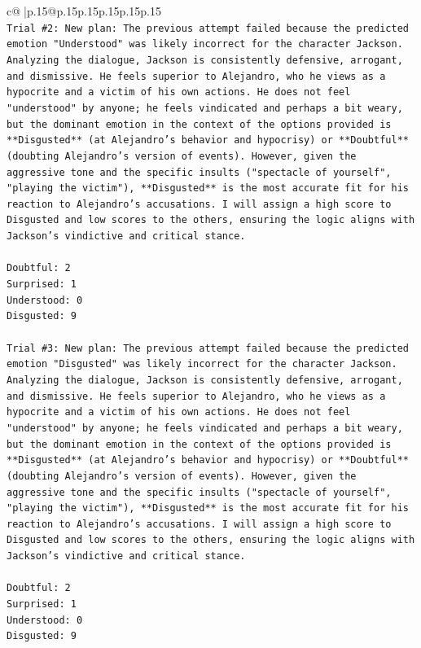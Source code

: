 \documentclass{article}
\begin{document}
{\begin{supertabular}{c@{$\;$}|p{.15\linewidth}@{}p{.15\linewidth}p{.15\linewidth}p{.15\linewidth}p{.15\linewidth}p{.15\linewidth}}
{{{\\ 
\texttt{Trial \#2: New plan: The previous attempt failed because the predicted emotion "Understood" was likely incorrect for the character Jackson. Analyzing the dialogue, Jackson is consistently defensive, arrogant, and dismissive. He feels superior to Alejandro, who he views as a hypocrite and a victim of his own actions. He does not feel "understood" by anyone; he feels vindicated and perhaps a bit weary, but the dominant emotion in the context of the options provided is **Disgusted** (at Alejandro's behavior and hypocrisy) or **Doubtful** (doubting Alejandro's version of events). However, given the aggressive tone and the specific insults ("spectacle of yourself", "playing the victim"), **Disgusted** is the most accurate fit for his reaction to Alejandro's accusations. I will assign a high score to Disgusted and low scores to the others, ensuring the logic aligns with Jackson's vindictive and critical stance.} \\
\\ 
\texttt{Doubtful: 2} \\
\texttt{Surprised: 1} \\
\texttt{Understood: 0} \\
\texttt{Disgusted: 9} \\
\\ 
\texttt{Trial \#3: New plan: The previous attempt failed because the predicted emotion "Disgusted" was likely incorrect for the character Jackson. Analyzing the dialogue, Jackson is consistently defensive, arrogant, and dismissive. He feels superior to Alejandro, who he views as a hypocrite and a victim of his own actions. He does not feel "understood" by anyone; he feels vindicated and perhaps a bit weary, but the dominant emotion in the context of the options provided is **Disgusted** (at Alejandro's behavior and hypocrisy) or **Doubtful** (doubting Alejandro's version of events). However, given the aggressive tone and the specific insults ("spectacle of yourself", "playing the victim"), **Disgusted** is the most accurate fit for his reaction to Alejandro's accusations. I will assign a high score to Disgusted and low scores to the others, ensuring the logic aligns with Jackson's vindictive and critical stance.} \\
\\ 
\texttt{Doubtful: 2} \\
\texttt{Surprised: 1} \\
\texttt{Understood: 0} \\
\texttt{Disgusted: 9} \\
}}}
\end{supertabular}}
\end{document}
